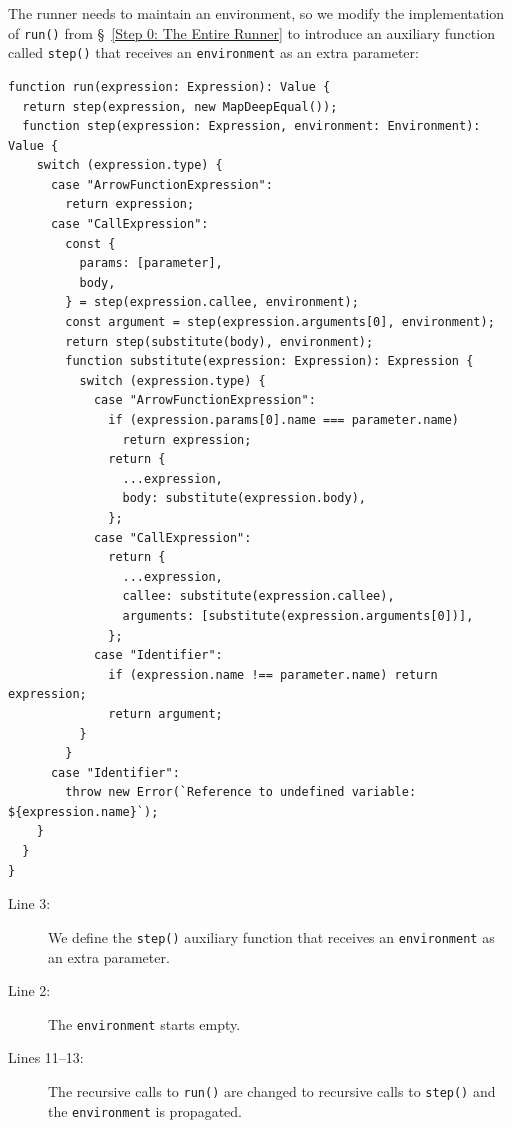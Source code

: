 \documentclass[12pt, oneside]{book}
\begin{document}
The runner needs to maintain an environment, so we modify the implementation of \texttt{run()} from §~\ref{Step 0: The Entire Runner} to introduce an auxiliary function called \texttt{step()} that receives an \texttt{environment} as an extra parameter:

\begin{verbatim}
function run(expression: Expression): Value {
  return step(expression, new MapDeepEqual());
  function step(expression: Expression, environment: Environment): Value {
    switch (expression.type) {
      case "ArrowFunctionExpression":
        return expression;
      case "CallExpression":
        const {
          params: [parameter],
          body,
        } = step(expression.callee, environment);
        const argument = step(expression.arguments[0], environment);
        return step(substitute(body), environment);
        function substitute(expression: Expression): Expression {
          switch (expression.type) {
            case "ArrowFunctionExpression":
              if (expression.params[0].name === parameter.name)
                return expression;
              return {
                ...expression,
                body: substitute(expression.body),
              };
            case "CallExpression":
              return {
                ...expression,
                callee: substitute(expression.callee),
                arguments: [substitute(expression.arguments[0])],
              };
            case "Identifier":
              if (expression.name !== parameter.name) return expression;
              return argument;
          }
        }
      case "Identifier":
        throw new Error(`Reference to undefined variable: ${expression.name}`);
    }
  }
}
\end{verbatim}

\begin{description}
\item [Line 3:] We define the \texttt{step()} auxiliary function that receives an \texttt{environment} as an extra parameter.

\item [Line 2:] The \texttt{environment} starts empty.

\item [Lines 11–13:] The recursive calls to \texttt{run()} are changed to recursive calls to \texttt{step()} and the \texttt{environment} is propagated.
\end{description}
\end{document}
